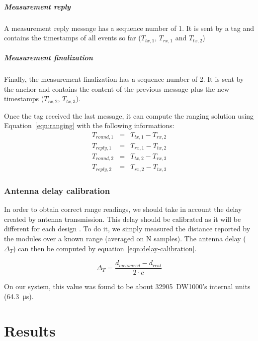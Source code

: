\documentclass[a4paper, 12pt]{scrreprt}
\begin{document}
\paragraph{Measurement reply}
A measurement reply message has a sequence number of 1.
It is sent by a tag and contains the timestamps of all events so far ($T_{tx,1}$, $T_{rx,1}$ and $T_{tx,2}$)

\paragraph{Measurement finalization}
Finally, the measurement finalization has a sequence number of 2.
It is sent by the anchor and contains the content of the previous message plus the new timestamps ($T_{rx,2}$, $T_{tx,3}$).

Once the tag received the last message, it can compute the ranging solution using Equation~\ref{eqn:ranging} with the following informations:
\begin{eqnarray*}
    T_{round,1} &=& T_{tx,1} - T_{rx,2} \\
    T_{reply,1} &=& T_{rx,1} - T_{tx,2} \\
    T_{round,2} &=& T_{tx,2} - T_{rx,3} \\
    T_{reply,2} &=& T_{rx,2} - T_{tx,3} 
\end{eqnarray*}



\subsection{Antenna delay calibration}
In order to obtain correct range readings, we should take in account the delay created by antenna transmission.
This delay should be calibrated as it will be different for each design \cite{dw1000manual}.
To do it, we simply measured the distance reported by the modules over a known range (averaged on N samples).
The antenna delay ($\Delta_T$) can then be computed by equation~\ref{eqn:delay-calibration}.

\begin{equation}
    \Delta_T = \frac{d_{measured} - d_{real}}{2\cdot c}
    \label{eqn:delay-calibration}
\end{equation}

On our system, this value was found to be about 32905~DW1000's internal units (\SI{64.3}{\micro\second}).

\chapter{Results}
\end{document}
